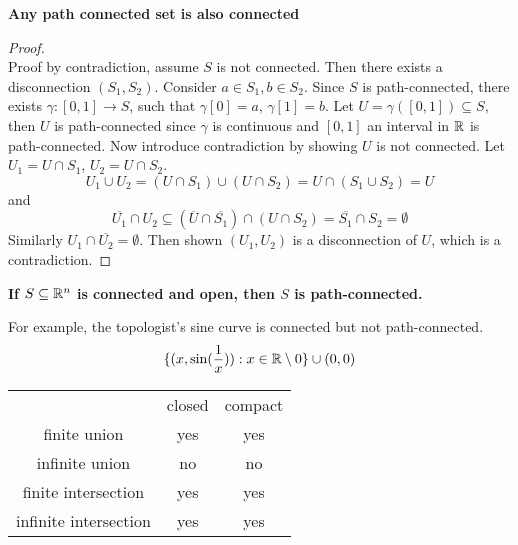 \documentclass[11pt]{article}
\begin{document}
\begin{theorem}
  \label{Any set which is path connected is also connected}
  \textbf{Any path connected set is also connected}
  \begin{proof}
    $ $\\
    Proof by contradiction, assume $S$ is not connected. Then there exists a disconnection $(S_1, S_2)$.  Consider $a\in S_1, b\in S_2$. Since $S$ is path-connected, there exists $\gamma: [0,1]\rightarrow S$, such that $\gamma[0] = a$, $\gamma[1] = b$. Let $U= \gamma([0,1])\subseteq S$, then $U$ is path-connected since $\gamma$ is continuous and $[0,1]$ an interval in $\mathbb{R}$ is path-connected. Now introduce contradiction by showing $U$ is not connected. Let $U_1 = U\cap S_1$, $U_2 = U\cap S_2$.
    \[
      U_1\cup U_2 = (U\cap S_1)\cup (U\cap S_2) = U\cap (S_1\cup S_2) = U
    \]
    and
    \[
      \overline{U_1}\cap U_2 \subseteq (\overline{U}\cap \overline{S_1})\cap (U\cap S_2) = \overline{S_1}\cap S_2 = \emptyset
    \]
    Similarly $U_1\cap \overline{U_2}=\emptyset$. Then shown $(U_1, U_2)$ is a disconnection of $U$, which is a contradiction.
  \end{proof}
\end{theorem}


\begin{theorem}
  \label{connected set not necessarily path-connected}
  \textbf{If $S\subseteq \mathbb{R}^n$ is connected and open, then $S$ is path-connected.}
  \begin{rem}
    For example, the topologist's sine curve is connected but not path-connected.
    \[
      \{ (x, \sin(\frac{1}{x})): x\in\mathbb{R} \setminus {0} \} \cup (0,0)
    \]
  \end{rem}
\end{theorem}



\begin{center}
  \begin{tabular}{ c c c }
                           & closed   & compact \\
     finite union          & yes      & yes  \\
     infinite union        & no       & no  \\
     finite intersection   & yes      & yes \\
     infinite intersection & yes      & yes \\
  \end{tabular}
\end{center}
\end{document}
